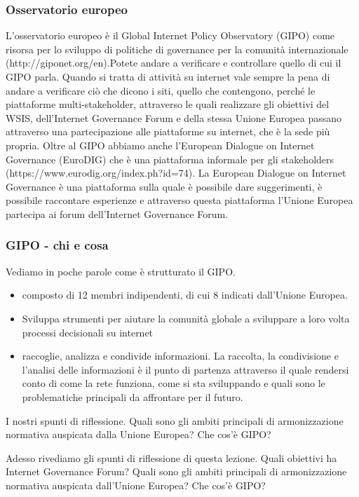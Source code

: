 \subsubsection{Osservatorio europeo}
L'osservatorio europeo è il Global Internet Policy Observatory (GIPO) come risorsa per lo sviluppo di politiche di governance per la comunità internazionale (http://giponet.org/en).Potete andare a verificare e controllare quello di cui il GIPO parla. Quando si tratta di attività su internet vale sempre la pena di andare a verificare ciò che dicono i siti, quello che contengono, perché le piattaforme multi-stakeholder, attraverso le quali realizzare gli obiettivi del WSIS, dell'Internet Governance Forum e della stessa Unione Europea passano attraverso una partecipazione alle piattaforme su internet, che è la sede più propria.
Oltre al GIPO abbiamo anche l'European Dialogue on Internet Governance (EuroDIG) che è una piattaforma informale per gli stakeholders (https://www.eurodig.org/index.ph?id=74). La European Dialogue on Internet Governance è una piattaforma sulla quale è possibile dare suggerimenti, è possibile raccontare esperienze e attraverso questa piattaforma l'Unione Europea partecipa ai forum dell'Internet Governance Forum.

\subsubsection{GIPO - chi e cosa}
Vediamo in poche parole come è strutturato il GIPO.

\begin{itemize}
    \item composto di 12 membri indipendenti, di cui 8 indicati dall'Unione Europea.
    \item Sviluppa strumenti per aiutare la comunità globale a sviluppare a loro volta processi decisionali su internet
    \item raccoglie, analizza e condivide informazioni. La raccolta, la condivisione e l'analisi delle informazioni è il punto di partenza attraverso il quale rendersi conto di come la rete funziona, come si sta sviluppando e quali sono le problematiche principali da affrontare per il futuro.
\end{itemize}

I nostri spunti di riflessione. Quali sono gli ambiti principali di armonizzazione normativa auspicata dalla Unione Europea? Che cos'è GIPO?


Adesso rivediamo gli spunti di riflessione di questa lezione. Quali obiettivi ha Internet Governance Forum? Quali sono gli ambiti principali di armonizzazione normativa auspicata dall'Unione Europea? Che cos'è GIPO?